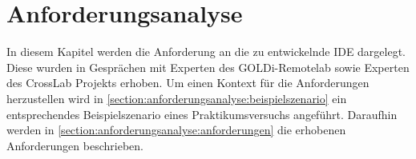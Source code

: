 \chapter{Anforderungsanalyse}\label{section:anforderungsanalyse}

In diesem Kapitel werden die Anforderung an die zu entwickelnde IDE dargelegt. Diese wurden in Gesprächen mit Experten des GOLDi-Remotelab sowie Experten des CrossLab Projekts erhoben. Um einen Kontext für die Anforderungen herzustellen wird in \autoref{section:anforderungsanalyse:beispielszenario} ein entsprechendes Beispielszenario eines Praktikumsversuchs angeführt. Daraufhin werden in \autoref{section:anforderungsanalyse:anforderungen} die erhobenen Anforderungen beschrieben.



